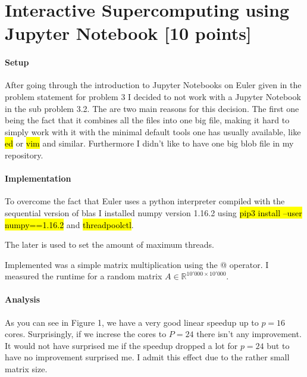 \documentclass[unicode,11pt,a4paper,oneside,numbers=endperiod,openany]{scrartcl}
\begin{document}

\section{Interactive Supercomputing using Jupyter Notebook  [10 points]}

\paragraph{Setup}
After going through the introduction to Jupyter Notebooks on Euler given in
the problem statement for problem 3 I decided to not work with a Jupyter
Notebook in the sub problem 3.2. The are two main reasons for this decision. The
first one being the fact that it combines all the files into one big file,
making it hard to simply work with it with the minimal default tools one has
usually available, like \hl{ed} or \hl{vim} and similar. Furthermore I didn't
like to have one big blob file in my repository.

\paragraph{Implementation}
To overcome the fact that Euler uses a python interpreter compiled with the
sequential version of blas I installed numpy version 1.16.2 using
\hl{pip3 install --user numpy==1.16.2} and \hl{threadpoolctl}.


The later is used to set the amount of maximum threads.

Implemented was a simple matrix multiplication using the @ operator. I measured
the runtime for a random matrix $A\in \mathbb R^{10'000\times 10'000}$.

\paragraph{Analysis}
As you can see in Figure 1, we have a very good linear speedup up to $p=16$
cores. Surprisingly, if we increse the cores to $P=24$ there isn't any
improvement. It would not have surprised me if the speedup dropped a lot for
$p=24$ but to have no improvement surprised me. I admit this effect due to the
rather small matrix size.
\end{document}
